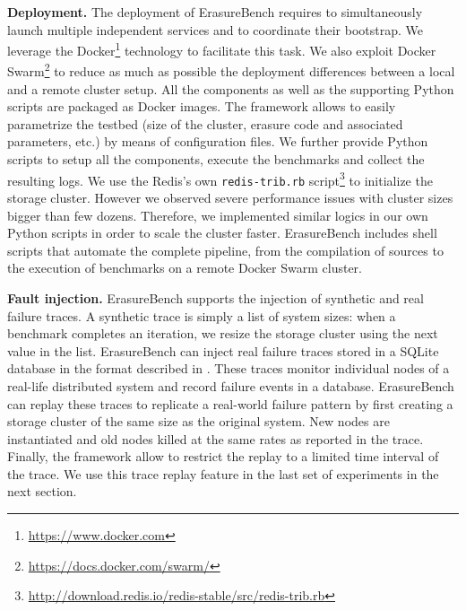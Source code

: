 \textbf{Deployment.} The deployment of ErasureBench requires to simultaneously launch multiple independent services and to coordinate their bootstrap. 
We leverage the Docker\footnote{\url{https://www.docker.com}} technology to facilitate this task.
We also exploit Docker Swarm\footnote{\url{https://docs.docker.com/swarm/}} to reduce as much as possible the deployment differences between a local and a remote cluster setup. %
All the components as well as the supporting Python scripts are packaged as Docker images.
The framework allows to easily parametrize the testbed (size of the cluster, erasure code and associated parameters, etc.) by means of configuration files. 
We further provide Python scripts to setup all the components, execute the benchmarks and collect the resulting logs.
We use the Redis's own \texttt{redis-trib.rb} script\footnote{\url{http://download.redis.io/redis-stable/src/redis-trib.rb}} to initialize the storage cluster.
However we observed severe performance issues with cluster sizes bigger than few dozens.
Therefore, we implemented similar logics in our own Python scripts in order to scale the cluster faster.
ErasureBench includes shell scripts that automate the complete pipeline, from the compilation of sources to the execution of benchmarks on a remote Docker Swarm cluster.

\textbf{Fault injection.}
ErasureBench supports the injection of synthetic and real failure traces. 
A synthetic trace is simply a list of system sizes: when a benchmark completes an iteration, we resize the storage cluster using the next value in the list. 
ErasureBench can inject real failure traces stored in a SQLite database in the format described in \autocite{fta-journal}. 
These traces monitor individual nodes of a real-life distributed system and record failure events in a database. 
ErasureBench can replay these traces to replicate a real-world failure pattern by first creating a storage cluster of the same size as the original system. 
New nodes are instantiated and old nodes killed at the same rates as reported in the trace. 
Finally, the framework allow to restrict the replay to a limited time interval of the trace.
We use this trace replay feature in the last set of experiments in the next section.